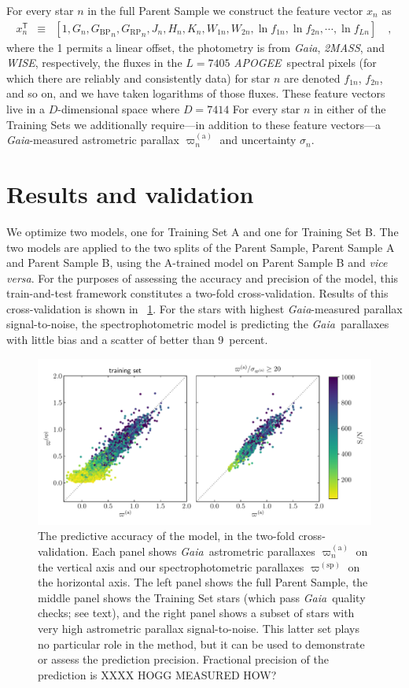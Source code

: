 \documentclass[modern]{aastex62}
\newcommand{\foreign}[1]{\textsl{#1}}
\newcommand{\acronym}[1]{{\small{#1}}}
\newcommand{\project}[1]{\textsl{#1}}
\newcommand{\apogee}{\project{\acronym{APOGEE}}}
\newcommand{\gaia}{\project{Gaia}}
\newcommand{\wise}{\project{\acronym{WISE}}}
\newcommand{\zmass}{\project{\acronym{2MASS}}}
\newcommand{\T}{^{\mathsf{T}}}
\newcommand{\BP}{{G_\mathrm{BP}}}
\newcommand{\RP}{{G_\mathrm{RP}}}
\newcommand{\gparallax}{\varpi^{(\mathrm{a})}}
\newcommand{\sparallax}{\varpi^{(\mathrm{sp})}}
\begin{document}
For every star $n$ in the full Parent Sample we construct the feature
vector $x_n$ as
\begin{eqnarray}
x_n\T &\equiv& [1, G_n, \BP_n, \RP_n, J_n, H_n, K_n, W_{1n}, W_{2n}, \ln f_{1n}, \ln f_{2n}, \cdots, \ln f_{Ln}]
\quad ,
\end{eqnarray}
where the 1 permits a linear offset,
the photometry is from \gaia, \zmass, and \wise, respectively,
the fluxes in the $L=7405$ \apogee\ spectral pixels (for which there are reliably
and consistently data) for star $n$ are denoted
$f_{1n}$, $f_{2n}$, and so on,
and we have taken logarithms of those fluxes.
These feature vectors live in a $D$-dimensional space where $D=7414$
For every star $n$ in either of the Training Sets we additionally require---in
addition to these feature vectors---a \gaia-measured astrometric parallax $\gparallax_n$
and uncertainty $\sigma_n$.

\section{Results and validation}

We optimize two models, one for Training Set A and one for Training Set B.
The two models are applied to the two splits of the Parent Sample, Parent Sample
A and Parent Sample B, using the A-trained model on Parent Sample B and
\foreign{vice versa}.
For the purposes of assessing the accuracy and precision of the model, this
train-and-test framework constitutes a two-fold cross-validation.
Results of this cross-validation is shown in \figurename~\ref{fig:xval}.
For the stars with highest \gaia-measured parallax signal-to-noise,
the spectrophotometric model is predicting the \gaia\ parallaxes with little bias
and a scatter of better than 9~percent.
\begin{figure}
\includegraphics[width=\textwidth]{residuals.pdf}
\caption{The predictive accuracy of the model, in the two-fold cross-validation.
  Each panel shows \gaia\ astrometric parallaxes $\gparallax_n$ on the vertical axis
  and our spectrophotometric parallaxes $\sparallax$ on the horizontal axis.
  The left panel shows the full Parent Sample, the middle panel shows the Training Set
  stars (which pass \gaia\ quality checks; see text), and the right panel shows a
  subset of stars with very high astrometric parallax signal-to-noise. This latter
  set plays no particular role in the method, but it can be used to demonstrate or
  assess the prediction precision. Fractional precision of the prediction
  is XXXX HOGG MEASURED HOW?\label{fig:xval}}
\end{figure}
\end{document}
